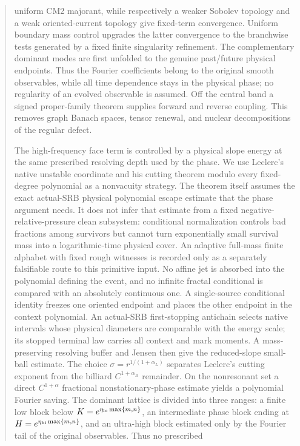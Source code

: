 \documentclass[11pt]{article}
\begin{document}
\begin{abstract}
uniform CM2 majorant, while respectively a weaker Sobolev topology and a
weak oriented-current topology give fixed-term convergence.  Uniform boundary
mass control upgrades the latter convergence to the branchwise tests generated
by a fixed finite singularity refinement.
The complementary dominant
modes are first unfolded to the genuine past/future physical endpoints.  Thus
the Fourier coefficients belong to the original smooth observables, while all
time dependence stays in the physical phase; no regularity of an evolved
observable is assumed.  Off the
central band a signed proper-family theorem supplies forward and reverse
coupling.  This removes graph Banach spaces, tensor renewal, and nuclear
decompositions of the regular defect.

The high-frequency face term is controlled by a physical slope energy at the
same prescribed resolving depth used by the phase.  We
use Leclerc's native unstable coordinate and his cutting theorem modulo every
fixed-degree polynomial as a nonvacuity strategy.  The theorem itself assumes
the exact actual-SRB physical polynomial escape estimate that the phase
argument needs.  It does not infer that estimate from a fixed
negative-relative-pressure clean subsystem: conditional normalization
controls bad fractions among survivors but cannot turn exponentially small
survival mass into a logarithmic-time physical cover.  An adaptive
full-mass finite alphabet with fixed rough witnesses is recorded only as a
separately falsifiable route to this primitive input.  No affine jet is absorbed into the polynomial
defining the event, and no infinite fractal conditional is compared with an
absolutely continuous one.  A single-source
conditional identity freezes one oriented endpoint and places the other
endpoint in the context polynomial.  An actual-SRB first-stopping antichain
selects native intervals whose physical diameters are comparable with the
energy scale; its stopped terminal law carries all context and mark moments.
A mass-preserving resolving buffer and Jensen then give the reduced-slope
small-ball estimate.  The
choice $\sigma=r^{1/(1+\alpha_L)}$ separates Leclerc's cutting exponent from
the billiard $C^{1+\alpha_B}$ remainder.  On the nonresonant set a direct
$C^{1+\alpha}$ fractional nonstationary-phase estimate yields a polynomial
Fourier saving.  The dominant lattice is divided into three ranges: a finite
low block below $K=e^{\eta_{\rm lo}\max\{m,n\}}$, an intermediate phase block
ending at $H=e^{\eta_{\rm hi}\max\{m,n\}}$, and an ultra-high block estimated
only by the Fourier tail of the original observables.  Thus no prescribed

\end{abstract}
\end{document}
